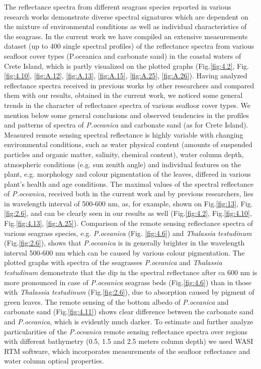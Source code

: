 \documentclass[11pt]{article}
\begin{document}
The reflectance spectra from different seagrass species reported in various research works demonstrate diverse spectral signatures which are dependent on the mixture of environmental conditions as well as individual characteristics of the seagrass. 
In the current work we have compiled an extensive measurements dataset (up to 400 single spectral profiles) of the reflectance spectra from various seafloor cover types (P.oceanica and carbonate sand) in the coastal waters of Crete Island, which is partly visualized on the plotted graphs (Fig.\ref{fig:4.2}, Fig.\ref{fig:4.10}, \ref{fig:A.12}, \ref{fig:A.13}, \ref{fig:A.15}, \ref{fig:A.25}, \ref{fig:A.26}).
Having analyzed reflectance spectra received in previous works by other researchers and compared them with our results, obtained in the current work, we noticed some general trends in the character of reflectance spectra of various seafloor cover types. We mention below some general conclusions and observed tendencies in the profiles and patterns of spectra of \textit{P.oceanica} and carbonate sand (as for Crete Island). 
Measured remote sensing spectral reflectance is highly variable with changing environmental conditions, such as water physical content (amounts of suspended particles and organic matter, salinity, chemical content), water column depth, atmospheric conditions (e.g. sun zenith angle) and individual features on the plant, e.g. morphology and colour pigmentation of the leaves, differed in various plant's health and age conditions. 
The maximal values of the spectral reflectance of \textit{P.oceanica}, received both in the current work and by previous researchers, lies in wavelength interval of 500-600 nm, as, for example, shown on Fig.\ref{fig:13}, Fig.\ref{fig:2.6}, and can be clearly seen in our results as well (Fig.\ref{fig:4.2}, Fig.\ref{fig:4.10}, Fig.\ref{fig:4.13}, \ref{fig:A.25}). Comparison of the remote sensing reflectance spectra of various seagrass species, e.g. \textit{P.oceanica} (Fig. \ref{fig:4.6}) and \textit{Thalassia testudinum}\label{page-21} (Fig.\ref{fig:2.6}), shows that \textit{P.oceanica} is in generally brighter in the wavelength interval 500-600 nm which can be caused by various colour pigmentation. The plotted graphs with spectra of the seagrasses \textit{P.oceanica} and \textit{Thalassia testudinum} demonstrate that the dip in the spectral reflectance after ca 600 nm is more pronounced in case of \textit{P.oceanica} seagrass beds (Fig.\ref{fig:4.6}) than in those with \textit{Thalassia testudinum} (Fig.\ref{fig:2.6}), due to absorption caused by pigment of green leaves. 
The remote sensing of the bottom albedo of \textit{P.oceanica} and carbonate sand (Fig.\ref{fig:4.11}) shows clear difference between the carbonate sand and \textit{P.oceanica}, which is evidently much darker.  To estimate and further analyze particularities of the \textit{P.oceanica} remote sensing reflectance spectra over regions with different bathymetry (0.5, 1.5 and 2.5 meters column depth) we used \ac{WASI} \ac{RTM} software, which incorporates measurements of the seafloor reflectance and water column optical properties.\label{page-22}
\pagebreak
\end{document}
